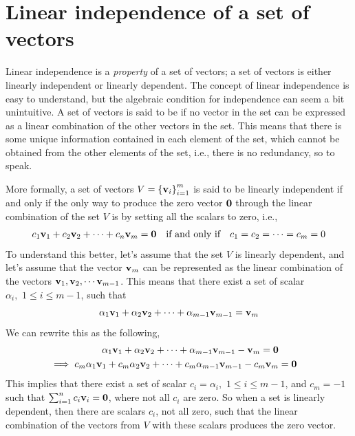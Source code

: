 \section{Linear independence of a set of vectors}
Linear independence is a \textit{property} of a set of vectors; a set of vectors is either linearly independent or linearly dependent. The concept of linear independence is easy to understand, but the algebraic condition for independence can seem a bit unintuitive. A set of vectors is said to be  if no vector in the set can be expressed as a linear combination of the other vectors in the set. This means that there is some unique  information contained in each element of the set, which cannot be obtained from the other elements of the set, i.e., there is no redundancy, so to speak. 

More formally, a set of vectors $V = \left\{ \mathbf{v}_i \right\}_{i=1}^{m}$ is said to be linearly independent if and only if the only way to produce the zero vector $\mathbf{0}$ through the linear combination of the set $V$ is by setting all the scalars to zero, i.e.,
\begin{equation}
    c_1 \mathbf{v}_1 + c_2 \mathbf{v}_2 + \cdots + c_n \mathbf{v}_m = \mathbf{0} \quad \text{if and only if} \quad c_1 = c_2 = \cdots = c_m = 0
    \label{eq:linear-indep}
\end{equation}
To understand this better, let's assume that the set $V$ is linearly dependent, and let's assume that the vector $\mathbf{v}_m$ can be represented as the linear combination of the vectors $\mathbf{v}_1, \mathbf{v}_2, \cdots \mathbf{v}_{m-1}$. This means that there exist a set of scalar $\alpha_i, \,\, 1 \leq i \leq m-1$, such that
\[ \alpha_1 \mathbf{v}_1 + \alpha_2 \mathbf{v}_2 + \cdots + \alpha_{m-1}\mathbf{v}_{m-1} = \mathbf{v}_m \]
We can rewrite this as the following,
\[ \begin{split}
    \alpha_1 \mathbf{v}_1 + \alpha_2 \mathbf{v}_2 + \cdots + \alpha_{m-1}\mathbf{v}_{m-1} - \mathbf{v}_m = \mathbf{0} \\
    \implies c_m\alpha_1 \mathbf{v}_1 + c_m\alpha_2 \mathbf{v}_2 + \cdots + c_m\alpha_{m-1}\mathbf{v}_{m-1} - c_m\mathbf{v}_m &= \mathbf{0}
\end{split} \]
This implies that there exist a set of scalar $c_i = \alpha_i, \,\, 1 \leq i \leq m-1$, and $c_m = -1$ such that $\sum_{i=1}^nc_i \mathbf{v}_i = \mathbf{0}$, where not all $c_i$ are zero. So when a set is linearly dependent, then there are scalars $c_i$, not all zero, such that the linear combination of the vectors from $V$ with these scalars produces the zero vector.

